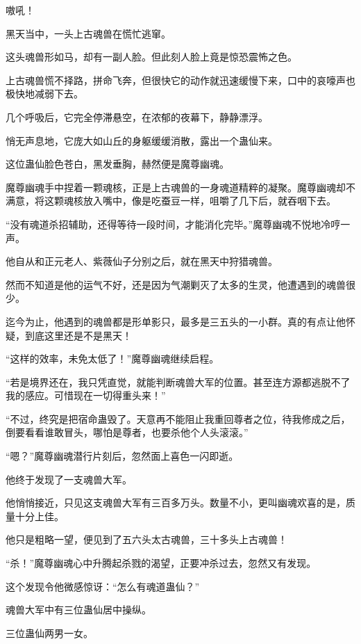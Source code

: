 
\begin{this_body}

嗷吼！

黑天当中，一头上古魂兽在慌忙逃窜。

这头魂兽形如马，却有一副人脸。但此刻人脸上竟是惊恐震怖之色。

上古魂兽慌不择路，拼命飞奔，但很快它的动作就迅速缓慢下来，口中的哀嚎声也极快地减弱下去。

几个呼吸后，它完全停滞悬空，在浓郁的夜幕下，静静漂浮。

悄无声息地，它庞大如山丘的身躯缓缓消散，露出一个蛊仙来。

这位蛊仙脸色苍白，黑发垂胸，赫然便是魔尊幽魂。

魔尊幽魂手中捏着一颗魂核，正是上古魂兽的一身魂道精粹的凝聚。魔尊幽魂却不满意，将这颗魂核放入嘴中，像是吃蚕豆一样，咀嚼了几下后，就吞咽下去。

“没有魂道杀招辅助，还得等待一段时间，才能消化完毕。”魔尊幽魂不悦地冷哼一声。

他自从和正元老人、紫薇仙子分别之后，就在黑天中狩猎魂兽。

然而不知道是他的运气不好，还是因为气潮剿灭了太多的生灵，他遭遇到的魂兽很少。

迄今为止，他遇到的魂兽都是形单影只，最多是三五头的一小群。真的有点让他怀疑，到底这里还是不是黑天！

“这样的效率，未免太低了！”魔尊幽魂继续启程。

“若是境界还在，我只凭直觉，就能判断魂兽大军的位置。甚至连方源都逃脱不了我的感应。可惜现在一切得重头来！”

“不过，终究是把宿命蛊毁了。天意再不能阻止我重回尊者之位，待我修成之后，倒要看看谁敢冒头，哪怕是尊者，也要杀他个人头滚滚。”

“嗯？”魔尊幽魂潜行片刻后，忽然面上喜色一闪即逝。

他终于发现了一支魂兽大军。

他悄悄接近，只见这支魂兽大军有三百多万头。数量不小，更叫幽魂欢喜的是，质量十分上佳。

他只是粗略一望，便见到了五六头太古魂兽，三十多头上古魂兽！

“杀！”魔尊幽魂心中升腾起杀戮的渴望，正要冲杀过去，忽然又有发现。

这个发现令他微感惊讶：“怎么有魂道蛊仙？”

魂兽大军中有三位蛊仙居中操纵。

三位蛊仙两男一女。


\end{this_body}
